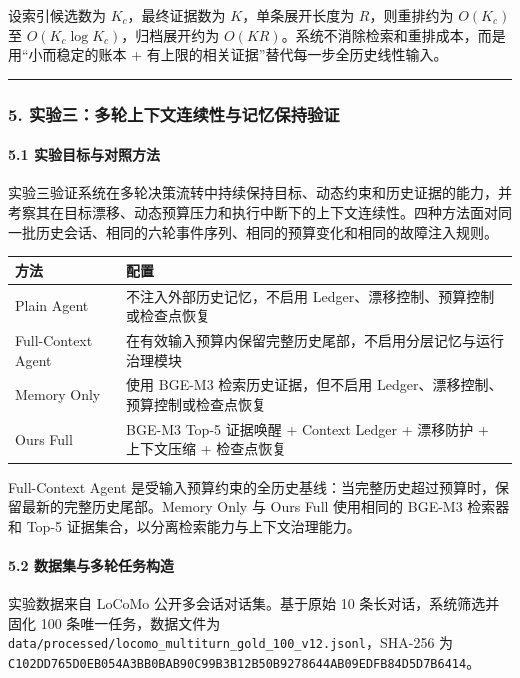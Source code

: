 \documentclass[UTF8,a4paper,12pt]{ctexart}
\begin{document}
设索引候选数为 \(K_c\)，最终证据数为 \(K\)，单条展开长度为 \(R\)，则重排约为 \(O(K_c)\) 至 \(O(K_c\log K_c)\)，归档展开约为 \(O(KR)\)。系统不消除检索和重排成本，而是用``小而稳定的账本 + 有上限的相关证据''替代每一步全历史线性输入。

\begin{center}\rule{0.5\linewidth}{0.5pt}\end{center}

\subsubsection{5. 实验三：多轮上下文连续性与记忆保持验证}

\paragraph{5.1 实验目标与对照方法}

实验三验证系统在多轮决策流转中持续保持目标、动态约束和历史证据的能力，并考察其在目标漂移、动态预算压力和执行中断下的上下文连续性。四种方法面对同一批历史会话、相同的六轮事件序列、相同的预算变化和相同的故障注入规则。

\begin{longtable}[]{@{}ll@{}}
\toprule
方法 & 配置 \\
\midrule
\endhead
Plain Agent & 不注入外部历史记忆，不启用 Ledger、漂移控制、预算控制或检查点恢复 \\
Full-Context Agent & 在有效输入预算内保留完整历史尾部，不启用分层记忆与运行治理模块 \\
Memory Only & 使用 BGE-M3 检索历史证据，但不启用 Ledger、漂移控制、预算控制或检查点恢复 \\
Ours Full & BGE-M3 Top-5 证据唤醒 + Context Ledger + 漂移防护 + 上下文压缩 + 检查点恢复 \\
\bottomrule
\end{longtable}

Full-Context Agent 是受输入预算约束的全历史基线：当完整历史超过预算时，保留最新的完整历史尾部。Memory Only 与 Ours Full 使用相同的 BGE-M3 检索器和 Top-5 证据集合，以分离检索能力与上下文治理能力。

\paragraph{5.2 数据集与多轮任务构造}

实验数据来自 LoCoMo 公开多会话对话集。基于原始 10 条长对话，系统筛选并固化 100 条唯一任务，数据文件为 \texttt{data/processed/locomo\_multiturn\_gold\_100\_v12.jsonl}，SHA-256 为 \texttt{C102DD765D0EB054A3BB0BAB90C99B3B12B50B9278644AB09EDFB84D5D7B6414}。
\end{document}
